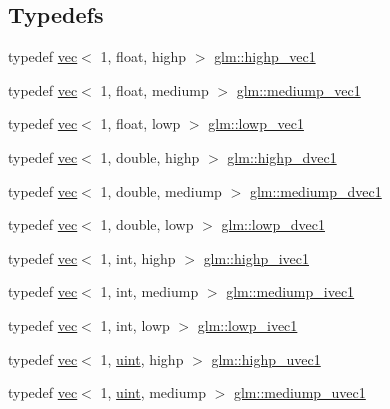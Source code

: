 \subsection*{Typedefs}
\begin{DoxyCompactItemize}
\item 
typedef \hyperlink{structglm_1_1vec}{vec}$<$ 1, float, highp $>$ \hyperlink{group__ext__vec1_gad8ebf6f2ad36cc3167e77f82b4ae9390}{glm\+::highp\+\_\+vec1}
\item 
typedef \hyperlink{structglm_1_1vec}{vec}$<$ 1, float, mediump $>$ \hyperlink{group__ext__vec1_gab1c2ec8c0cbca8b1f2346f37926b77a7}{glm\+::mediump\+\_\+vec1}
\item 
typedef \hyperlink{structglm_1_1vec}{vec}$<$ 1, float, lowp $>$ \hyperlink{group__ext__vec1_gac40fba97d9ffbd2b3146d913d4ebc811}{glm\+::lowp\+\_\+vec1}
\item 
typedef \hyperlink{structglm_1_1vec}{vec}$<$ 1, double, highp $>$ \hyperlink{group__ext__vec1_ga51e54e6b2fe3962fc44a176eeb3e3fe6}{glm\+::highp\+\_\+dvec1}
\item 
typedef \hyperlink{structglm_1_1vec}{vec}$<$ 1, double, mediump $>$ \hyperlink{group__ext__vec1_gabfbd2538da41381bc96ee634944b9a28}{glm\+::mediump\+\_\+dvec1}
\item 
typedef \hyperlink{structglm_1_1vec}{vec}$<$ 1, double, lowp $>$ \hyperlink{group__ext__vec1_ga4fa455d945a1e3e591689464c0f9090f}{glm\+::lowp\+\_\+dvec1}
\item 
typedef \hyperlink{structglm_1_1vec}{vec}$<$ 1, int, highp $>$ \hyperlink{group__ext__vec1_gac44dcd92c25ab0d3f5c514137d5460d8}{glm\+::highp\+\_\+ivec1}
\item 
typedef \hyperlink{structglm_1_1vec}{vec}$<$ 1, int, mediump $>$ \hyperlink{group__ext__vec1_gaa3adbc518fe07a292115c7662327effc}{glm\+::mediump\+\_\+ivec1}
\item 
typedef \hyperlink{structglm_1_1vec}{vec}$<$ 1, int, lowp $>$ \hyperlink{group__ext__vec1_ga46adb8a3dcf2312c343a093c3bf372d7}{glm\+::lowp\+\_\+ivec1}
\item 
typedef \hyperlink{structglm_1_1vec}{vec}$<$ 1, \hyperlink{group__core__precision_ga4fd29415871152bfb5abd588334147c8}{uint}, highp $>$ \hyperlink{group__ext__vec1_ga4e92a1105fa908e8a96971602381e381}{glm\+::highp\+\_\+uvec1}
\item 
typedef \hyperlink{structglm_1_1vec}{vec}$<$ 1, \hyperlink{group__core__precision_ga4fd29415871152bfb5abd588334147c8}{uint}, mediump $>$ \hyperlink{group__ext__vec1_ga30942ba23745b3fd4ec1fbd3068f7de4}{glm\+::mediump\+\_\+uvec1}

\end{DoxyCompactItemize}
